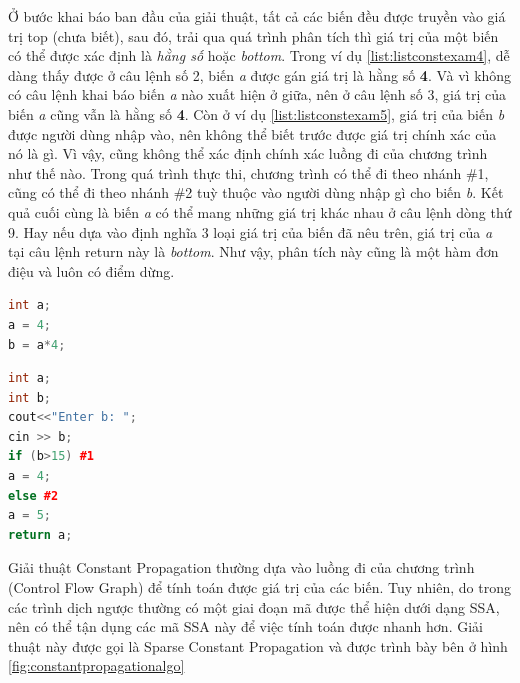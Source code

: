 Ở bước khai báo ban đầu của giải thuật, tất cả các biến đều được truyền vào giá trị top (chưa biết), sau đó, trải qua quá trình phân tích thì giá trị của một biến có thể được xác định là \textit{hằng số} hoặc \textit{bottom}. Trong ví dụ \ref{list:listconstexam4}, dễ dàng thấy được ở câu lệnh số 2, biến \textit{a} được gán giá trị là hằng số \textbf{4}. Và vì không có câu lệnh khai báo biến \textit{a} nào xuất hiện ở giữa, nên ở câu lệnh số 3, giá trị của biến \textit{a} cũng vẫn là hằng số \textbf{4}. Còn ở ví dụ \ref{list:listconstexam5}, giá trị của biến \textit{b} được người dùng nhập vào, nên không thể biết trước được giá trị chính xác của nó là gì. Vì vậy, cũng không thể xác định chính xác luồng đi của chương trình như thế nào. Trong quá trình thực thi, chương trình có thể đi theo nhánh \#1, cũng có thể đi theo nhánh \#2 tuỳ thuộc vào người dùng nhập gì cho biến \textit{b}. Kết quả cuối cùng là biến \textit{a} có thể mang những giá trị khác nhau ở câu lệnh dòng thứ 9. Hay nếu dựa vào định nghĩa 3 loại giá trị của biến đã nêu trên, giá trị của \textit{a} tại câu lệnh return này là \textit{bottom}. Như vậy, phân tích này cũng là một hàm đơn điệu \cite{constantpropagation} và luôn có điểm dừng.
\begin{lstlisting}[caption={Đoạn mã ví dụ biến có giá trị là hằng số},label={list:listconstexam4}, language=c++]
int a;
a = 4;
b = a*4;
\end{lstlisting}
\begin{lstlisting}[caption={Đoạn mã ví dụ biến có giá trị là bottom},label={list:listconstexam5}, language=c++]
int a;
int b;
cout<<"Enter b: ";
cin >> b;
if (b>15) #1
a = 4;
else #2
a = 5;
return a;
\end{lstlisting}

Giải thuật Constant Propagation thường dựa vào luồng đi của chương trình (Control Flow Graph) để tính toán được giá trị của các biến. Tuy nhiên, do trong các trình dịch ngược thường có một giai đoạn mã được thể hiện dưới dạng SSA, nên có thể tận dụng các mã SSA này để việc tính toán được nhanh hơn. Giải thuật này được gọi là Sparse Constant Propagation và được trình bày bên ở hình \ref{fig:constantpropagationalgo}

